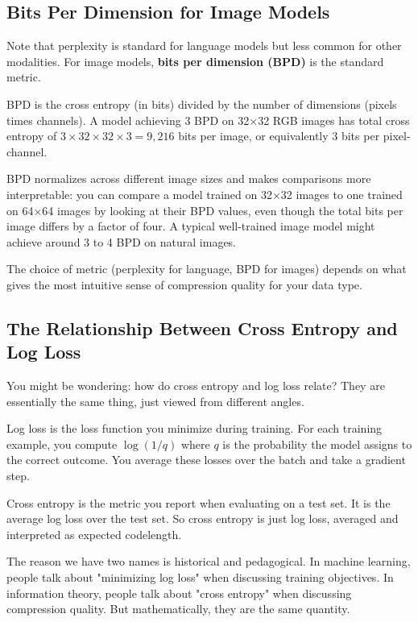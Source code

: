 \subsection{Bits Per Dimension for Image Models}

Note that perplexity is standard for language models but less common for other modalities. For image models, \textbf{bits per dimension (BPD)} is the standard metric.

BPD is the cross entropy (in bits) divided by the number of dimensions (pixels times channels). A model achieving 3 BPD on 32×32 RGB images has total cross entropy of $3 \times 32 \times 32 \times 3 = 9{,}216$ bits per image, or equivalently 3 bits per pixel-channel.

BPD normalizes across different image sizes and makes comparisons more interpretable: you can compare a model trained on 32×32 images to one trained on 64×64 images by looking at their BPD values, even though the total bits per image differs by a factor of four. A typical well-trained image model might achieve around 3 to 4 BPD on natural images.

The choice of metric (perplexity for language, BPD for images) depends on what gives the most intuitive sense of compression quality for your data type.

\subsection{The Relationship Between Cross Entropy and Log Loss}

You might be wondering: how do cross entropy and log loss relate? They are essentially the same thing, just viewed from different angles.

Log loss is the loss function you minimize during training. For each training example, you compute $\log(1/q)$ where $q$ is the probability the model assigns to the correct outcome. You average these losses over the batch and take a gradient step.

Cross entropy is the metric you report when evaluating on a test set. It is the average log loss over the test set. So cross entropy is just log loss, averaged and interpreted as expected codelength.

The reason we have two names is historical and pedagogical. In machine learning, people talk about "minimizing log loss" when discussing training objectives. In information theory, people talk about "cross entropy" when discussing compression quality. But mathematically, they are the same quantity.

